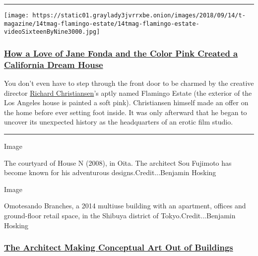 \begin{center}\rule{0.5\linewidth}{\linethickness}\end{center}

\texttt{[image: https://static01.graylady3jvrrxbe.onion/images/2018/09/14/t-magazine/14tmag-flamingo-estate/14tmag-flamingo-estate-videoSixteenByNine3000.jpg]}

\hypertarget{how-a-love-of-jane-fonda-and-the-color-pink-created-a-california-dream-house}{%
\subsubsection{\texorpdfstring{\textbf{\href{https://www.nytimes3xbfgragh.onion/2018/09/14/t-magazine/los-angeles-dream-house-flamingo-estate.html}{How
a Love of Jane Fonda and the Color Pink Created a California Dream
House}}}{How a Love of Jane Fonda and the Color Pink Created a California Dream House}}\label{how-a-love-of-jane-fonda-and-the-color-pink-created-a-california-dream-house}}

You don't even have to step through the front door to be charmed by the
creative director
\href{https://www.nytimes3xbfgragh.onion/2019/03/14/t-magazine/owl-bureau-los-angeles-book-store.html}{Richard
Christiansen}'s aptly named Flamingo Estate (the exterior of the Los
Angeles house is painted a soft pink). Christiansen himself made an
offer on the home before ever setting foot inside. It was only afterward
that he began to uncover its unexpected history as the headquarters of
an erotic film studio.

\begin{center}\rule{0.5\linewidth}{\linethickness}\end{center}

Image

The courtyard of House N (2008), in Oita. The architect Sou Fujimoto has
become known for his adventurous designs.Credit...Benjamin Hosking

Image

Omotesando Branches, a 2014 multiuse building with an apartment, offices
and ground-floor retail space, in the Shibuya district of
Tokyo.Credit...Benjamin Hosking

\hypertarget{the-architect-making-conceptual-art-out-of-buildings}{%
\subsubsection{\texorpdfstring{\textbf{\href{https://www.nytimes3xbfgragh.onion/2020/03/02/t-magazine/sou-fujimoto.html}{The
Architect Making Conceptual Art Out of
Buildings}}}{The Architect Making Conceptual Art Out of Buildings}}\label{the-architect-making-conceptual-art-out-of-buildings}}

